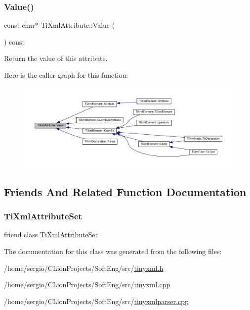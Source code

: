 \subsubsection{\texorpdfstring{Value()}{Value()}}
{\footnotesize\ttfamily const char$\ast$ Ti\+Xml\+Attribute\+::\+Value (\begin{DoxyParamCaption}{ }\end{DoxyParamCaption}) const\hspace{0.3cm}{\ttfamily [inline]}}



Return the value of this attribute. 

Here is the caller graph for this function\+:
\nopagebreak
\begin{figure}[H]
\begin{center}
\leavevmode
\includegraphics[width=350pt]{class_ti_xml_attribute_ac9f0b56fcacbedb6eb49e5f282bef014_icgraph}
\end{center}
\end{figure}


\subsection{Friends And Related Function Documentation}
\mbox{\label{class_ti_xml_attribute_a35a7b7f89f708527677d5078d41ce0bf}} 
\subsubsection{\texorpdfstring{Ti\+Xml\+Attribute\+Set}{TiXmlAttributeSet}}
{\footnotesize\ttfamily friend class \hyperlink{class_ti_xml_attribute_set}{Ti\+Xml\+Attribute\+Set}\hspace{0.3cm}{\ttfamily [friend]}}



The documentation for this class was generated from the following files\+:\begin{DoxyCompactItemize}
\item 
/home/sergio/\+C\+Lion\+Projects/\+Soft\+Eng/src/\hyperlink{tinyxml_8h}{tinyxml.\+h}\item 
/home/sergio/\+C\+Lion\+Projects/\+Soft\+Eng/src/\hyperlink{tinyxml_8cpp}{tinyxml.\+cpp}\item 
/home/sergio/\+C\+Lion\+Projects/\+Soft\+Eng/src/\hyperlink{tinyxmlparser_8cpp}{tinyxmlparser.\+cpp}\end{DoxyCompactItemize}
